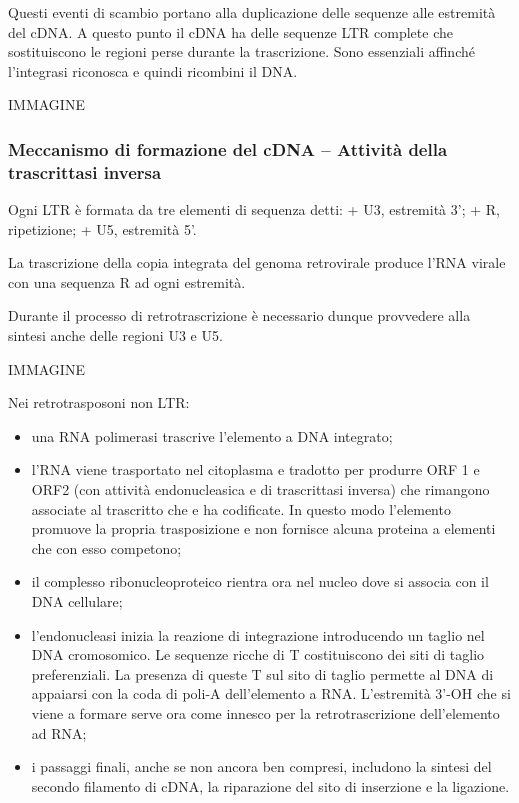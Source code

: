\documentclass[]{article}
\begin{document}
Questi eventi di scambio portano alla duplicazione delle sequenze alle
estremità del cDNA. A questo punto il cDNA ha delle sequenze LTR
complete che sostituiscono le regioni perse durante la trascrizione.
Sono essenziali affinché l'integrasi riconosca e quindi ricombini il
DNA.

IMMAGINE

\subsubsection{Meccanismo di formazione del cDNA -- Attività della
trascrittasi
inversa}\label{meccanismo-di-formazione-del-cdna-attivituxe0-della-trascrittasi-inversa}

Ogni LTR è formata da tre elementi di sequenza detti: + U3, estremità
3'; + R, ripetizione; + U5, estremità 5'.

La trascrizione della copia integrata del genoma retrovirale produce
l'RNA virale con una sequenza R ad ogni estremità.

Durante il processo di retrotrascrizione è necessario dunque provvedere
alla sintesi anche delle regioni U3 e U5.

IMMAGINE

Nei retrotrasposoni non LTR:

\begin{itemize}
\itemsep1pt\parskip0pt
\item
  una RNA polimerasi trascrive l'elemento a DNA integrato;
\item
  l'RNA viene trasportato nel citoplasma e tradotto per produrre ORF 1 e
  ORF2 (con attività endonucleasica e di trascrittasi inversa) che
  rimangono associate al trascritto che e ha codificate. In questo modo
  l'elemento promuove la propria trasposizione e non fornisce alcuna
  proteina a elementi che con esso competono;
\item
  il complesso ribonucleoproteico rientra ora nel nucleo dove si associa
  con il DNA cellulare;
\item
  l'endonucleasi inizia la reazione di integrazione introducendo un
  taglio nel DNA cromosomico. Le sequenze ricche di T costituiscono dei
  siti di taglio preferenziali. La presenza di queste T sul sito di
  taglio permette al DNA di appaiarsi con la coda di poli-A
  dell'elemento a RNA. L'estremità 3'-OH che si viene a formare serve
  ora come innesco per la retrotrascrizione dell'elemento ad RNA;
\item
  i passaggi finali, anche se non ancora ben compresi, includono la
  sintesi del secondo filamento di cDNA, la riparazione del sito di
  inserzione e la ligazione.
\end{itemize}
\end{document}
